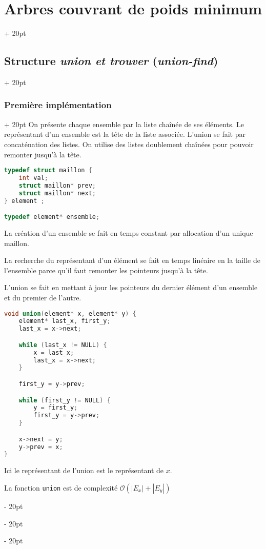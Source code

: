 \documentclass[a4paper, 12pt, twoside]{article}
\newcommand{\abs}[1]{\left\lvert #1 \right\rvert}
\newcommand{\ind}[1][20pt]{\advance\leftskip + #1}
\newcommand{\deind}[1][20pt]{\advance\leftskip - #1}
\newenvironment{indt}[2][20pt]{#2 \par \ind[#1]}{\par \deind} %
\begin{document}
\begin{indt}{\section{Arbres couvrant de poids minimum}}
\begin{indt}{\subsection{Structure \textit{union et trouver} (\textit{union-find})}}
            \vspace{12pt}
            
            \begin{indt}{\subsubsection{Première implémentation}}
                On présente chaque ensemble par la liste chaînée de ses éléments. Le représentant d'un ensemble est la tête de la liste associée.
                L'union se fait par concaténation des listes.
                On utilise des listes doublement chaînées pour pouvoir remonter jusqu'à la tête.

                \begin{lstlisting}[language=C, xleftmargin=80pt]
typedef struct maillon {
    int val;
    struct maillon* prev;
    struct maillon* next;
} element ;

typedef element* ensemble;\end{lstlisting}

                La création d'un ensemble se fait en temps constant par allocation d'un unique maillon.

                La recherche du représentant d'un élément se fait en temps linéaire en la taille de l'ensemble parce qu'il faut remonter les pointeurs jusqu'à la tête.

                L'union se fait en mettant à jour les pointeurs du dernier élément d'un ensemble et du premier de l'autre.

                \begin{lstlisting}[language=C, xleftmargin=80pt]
void union(element* x, element* y) {
    element* last_x, first_y;
    last_x = x->next;

    while (last_x != NULL) {
        x = last_x;
        last_x = x->next;
    }

    first_y = y->prev;

    while (first_y != NULL) {
        y = first_y;
        first_y = y->prev;
    }

    x->next = y;
    y->prev = x;
}\end{lstlisting}

                Ici le représentant de l'union est le représentant de $x$.

                La fonction \texttt{union} est de complexité $\mathcal O(\abs{E_x} + \abs{E_y})$

                \vspace{6pt}
                

\end{indt}
\end{indt}
\end{indt}
\end{document}
